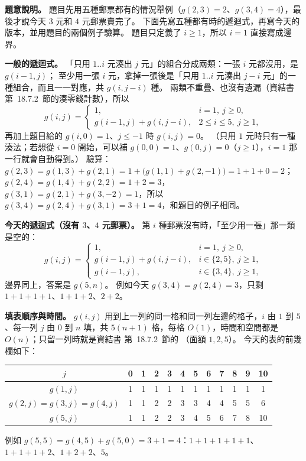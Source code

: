 \begin{pastsoln}
\textbf{題意說明。} 題目先用五種郵票都有的情況舉例（$g(2,3) = 2$、$g(3,4) = 4$），最後才說今天 $3$ 元和
$4$ 元郵票賣完了。 下面先寫五種都有時的遞迴式，再寫今天的版本，並用題目的兩個例子驗算。 題目只定義了
$i \ge 1$，所以 $i = 1$ 直接寫成邊界。

\textbf{一般的遞迴式。} 「只用 $1..i$ 元湊出 $j$ 元」的組合分成兩類：一張 $i$ 元都沒用，是 $g(i - 1, j)$；
至少用一張 $i$ 元，拿掉一張後是「只用 $1..i$ 元湊出 $j - i$ 元」的一種組合，而且一一對應，共
$g(i, j - i)$ 種。 兩類不重疊、也沒有遺漏（資結書第~18.7.2~節的湊零錢計數），所以
\[
g(i, j) = \begin{cases}
1, & i = 1,\ j \ge 0, \\
g(i - 1, j) + g(i, j - i), & 2 \le i \le 5,\ j \ge 1,
\end{cases}
\]
再加上題目給的 $g(i, 0) = 1$、$j \le -1$ 時 $g(i, j) = 0$。 （只用 $1$ 元時只有一種湊法；若想從 $i = 0$
開始，可以補 $g(0, 0) = 1$、$g(0, j) = 0$（$j \ge 1$），$i = 1$ 那一行就會自動得到。）
驗算：$g(2, 3) = g(1, 3) + g(2, 1) = 1 + \bigl(g(1, 1) + g(2, -1)\bigr) = 1 + 1 + 0 = 2$；
$g(2, 4) = g(1, 4) + g(2, 2) = 1 + 2 = 3$，$g(3, 1) = g(2, 1) + g(3, -2) = 1$，所以
$g(3, 4) = g(2, 4) + g(3, 1) = 3 + 1 = 4$，和題目的例子相同。

\textbf{今天的遞迴式（沒有 $3$、$4$ 元郵票）。} 第 $i$ 種郵票沒有時，「至少用一張」那一類是空的：
\[
g(i, j) = \begin{cases}
1, & i = 1,\ j \ge 0, \\
g(i - 1, j) + g(i, j - i), & i \in \{2, 5\},\ j \ge 1, \\
g(i - 1, j), & i \in \{3, 4\},\ j \ge 1,
\end{cases}
\]
邊界同上，答案是 $g(5, n)$。 例如今天 $g(3, 4) = g(2, 4) = 3$，只剩 $1 + 1 + 1 + 1$、$1 + 1 + 2$、$2 + 2$。

\textbf{填表順序與時間。} $g(i, j)$ 用到上一列的同一格和同一列左邊的格子，$i$ 由 $1$ 到 $5$、每一列 $j$
由 $0$ 到 $n$ 填，共 $5(n + 1)$ 格，每格 $O(1)$，時間和空間都是 $O(n)$；只留一列時就是資結書
第~18.7.2~節的 （面額 $1, 2, 5$）。 今天的表的前幾欄如下：
\begin{center}
\small
\begin{tabular}{c*{11}{c}}
\toprule
$j$ & 0 & 1 & 2 & 3 & 4 & 5 & 6 & 7 & 8 & 9 & 10 \\
\midrule
$g(1, j)$ & 1 & 1 & 1 & 1 & 1 & 1 & 1 & 1 & 1 & 1 & 1 \\
$g(2, j) = g(3, j) = g(4, j)$ & 1 & 1 & 2 & 2 & 3 & 3 & 4 & 4 & 5 & 5 & 6 \\
$g(5, j)$ & 1 & 1 & 2 & 2 & 3 & 4 & 5 & 6 & 7 & 8 & 10 \\
\bottomrule
\end{tabular}
\end{center}
例如 $g(5, 5) = g(4, 5) + g(5, 0) = 3 + 1 = 4$：$1 + 1 + 1 + 1 + 1$、$1 + 1 + 1 + 2$、$1 + 2 + 2$、$5$。
\end{pastsoln}
